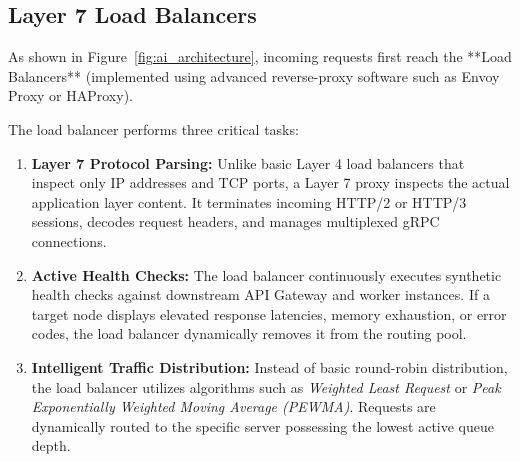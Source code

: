 \documentclass[12pt,a4paper]{report}
\begin{document}
\subsection{Layer 7 Load Balancers}
As shown in Figure~\ref{fig:ai_architecture}, incoming requests first reach the **Load Balancers** (implemented using advanced reverse-proxy software such as Envoy Proxy or HAProxy).

The load balancer performs three critical tasks:
\begin{enumerate}[leftmargin=1.2cm]
    \item \textbf{Layer 7 Protocol Parsing:} Unlike basic Layer 4 load balancers that inspect only IP addresses and TCP ports, a Layer 7 proxy inspects the actual application layer content. It terminates incoming HTTP/2 or HTTP/3 sessions, decodes request headers, and manages multiplexed gRPC connections.
    \item \textbf{Active Health Checks:} The load balancer continuously executes synthetic health checks against downstream API Gateway and worker instances. If a target node displays elevated response latencies, memory exhaustion, or error codes, the load balancer dynamically removes it from the routing pool.
    \item \textbf{Intelligent Traffic Distribution:} Instead of basic round-robin distribution, the load balancer utilizes algorithms such as \textit{Weighted Least Request} or \textit{Peak Exponentially Weighted Moving Average (PEWMA)}. Requests are dynamically routed to the specific server possessing the lowest active queue depth.
\end{enumerate}
\end{document}
